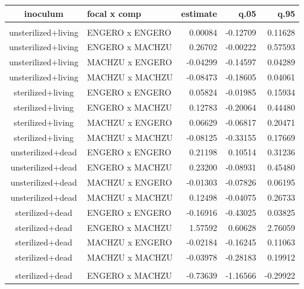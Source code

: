 \begin{table}[t]
\fontsize{12.0pt}{14.4pt}\selectfont
\begin{tabular*}{\linewidth}{@{\extracolsep{\fill}}clrrr}
\toprule
inoculum & focal x comp & estimate & q.05 & q.95 \\ 
\midrule\addlinespace[2.5pt]
\multicolumn{5}{l}{1st order} \\[2.5pt] 
\midrule\addlinespace[2.5pt]
unsterilized+living & ENGERO x ENGERO & 0.00084 & -0.12709 & 0.11628 \\ 
unsterilized+living & ENGERO x MACHZU & 0.26702 & -0.00222 & 0.57593 \\ 
unsterilized+living & MACHZU x ENGERO & -0.04299 & -0.14597 & 0.04289 \\ 
unsterilized+living & MACHZU x MACHZU & -0.08473 & -0.18605 & 0.04061 \\ 
sterilized+living & ENGERO x ENGERO & 0.05824 & -0.01985 & 0.15934 \\ 
sterilized+living & ENGERO x MACHZU & 0.12783 & -0.20064 & 0.44480 \\ 
sterilized+living & MACHZU x ENGERO & 0.06629 & -0.06817 & 0.20471 \\ 
sterilized+living & MACHZU x MACHZU & -0.08125 & -0.33155 & 0.17669 \\ 
unsterilized+dead & ENGERO x ENGERO & 0.21198 & 0.10514 & 0.31236 \\ 
unsterilized+dead & ENGERO x MACHZU & 0.23200 & -0.08931 & 0.45480 \\ 
unsterilized+dead & MACHZU x ENGERO & -0.01303 & -0.07826 & 0.06195 \\ 
unsterilized+dead & MACHZU x MACHZU & 0.12498 & -0.04075 & 0.26733 \\ 
sterilized+dead & ENGERO x ENGERO & -0.16916 & -0.43025 & 0.03825 \\ 
sterilized+dead & ENGERO x MACHZU & 1.57592 & 0.60628 & 2.76059 \\ 
sterilized+dead & MACHZU x ENGERO & -0.02184 & -0.16245 & 0.11063 \\ 
sterilized+dead & MACHZU x MACHZU & -0.03978 & -0.28183 & 0.19912 \\ 
\midrule\addlinespace[2.5pt]
\multicolumn{5}{l}{2nd order} \\[2.5pt] 
\midrule\addlinespace[2.5pt]
sterilized+dead & ENGERO x MACHZU & -0.73639 & -1.16566 & -0.29922 \\ 
\bottomrule
\end{tabular*}
\end{table}

